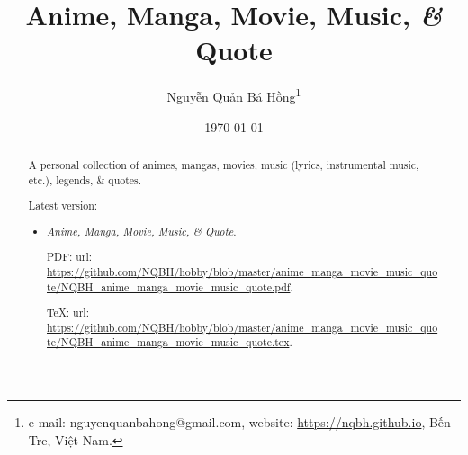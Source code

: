 \documentclass{article}
\title{Anime, Manga, Movie, Music, {\it\&} Quote}
\author{Nguyễn Quản Bá Hồng\footnote{e-mail: {\sf nguyenquanbahong@gmail.com}, website: \url{https://nqbh.github.io}, Bến Tre, Việt Nam.}}
\date{\today}
\begin{document}
\maketitle
\begin{abstract}
	A personal collection of animes, mangas, movies, music (lyrics, instrumental music, etc.), legends, \& quotes.
	
	Latest version:
	\begin{itemize}
		\item {\it Anime, Manga, Movie, Music, \& Quote}.
		
		PDF: {\sc url}: \url{https://github.com/NQBH/hobby/blob/master/anime_manga_movie_music_quote/NQBH_anime_manga_movie_music_quote.pdf}.
		
		\TeX: {\sc url}: \url{https://github.com/NQBH/hobby/blob/master/anime_manga_movie_music_quote/NQBH_anime_manga_movie_music_quote.tex}.
	\end{itemize}
\end{abstract}
\setcounter{secnumdepth}{4}
\setcounter{tocdepth}{4}
\tableofcontents

\end{document}
